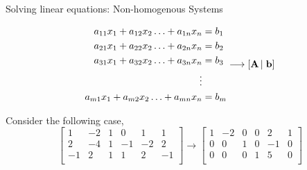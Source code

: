 \documentclass[aspectratio=169]{beamer}
\def\mf{\ensuremath\mathbf}
\begin{document}
\begin{frame}[t]{Solving linear equations: Non-homogenous Systems}
\vspace{-0.75cm}
\begin{footnotesize}
\[
\begin{split}
a_{11}x_1 + a_{12}x_2 \ldots + a_{1n}x_n & = b_1\\
a_{21}x_1 + a_{22}x_2 \ldots + a_{2n}x_n & = b_2\\
a_{31}x_1 + a_{32}x_2 \ldots + a_{3n}x_n & = b_3\\
\vdots & \\
a_{m1}x_1 + a_{m2}x_2 \ldots + a_{mn}x_n & = b_m\\
\end{split}\longrightarrow \left[ \mf{A} \left|\right.\mf{b}\right]
\]
\end{footnotesize}
\vspace{-0.3cm} 

\begin{scriptsize}
Consider the following case,
\vspace{-0.2cm} 
\[
\left[
\begin{array}{rrrrr|r}
1 & -2 & 1 & 0 & 1 & 1 \\
2 & -4 & 1 & -1 & -2 & 2 \\
-1 & 2 & 1 & 1 & 2 & -1 \\
\end{array}
\right] \longrightarrow  
\left[
\begin{array}{rrrrr|r}
1 & -2 &  0 &  0 &  2 &  1 \\
0 &  0 &  1 &  0 & -1 &  0 \\
0 &  0 &  0 &  1 &  5 &  0 \\
\end{array}
\right]
\]
\vspace{-1.0cm}


\end{scriptsize}
\end{frame}
\end{document}
